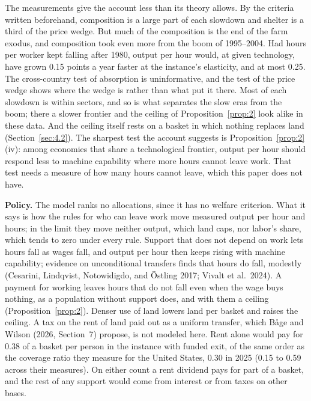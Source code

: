 \documentclass[12pt]{article}
\theoremstyle{plain}
\begin{document}
The measurements give the account less than its theory allows. By the criteria written beforehand, composition is a large part of each slowdown and shelter is a third of the price wedge. But much of the composition is the end of the farm exodus, and composition took even more from the boom of 1995--2004. Had hours per worker kept falling after 1980, output per hour would, at given technology, have grown 0.15 points a year faster at the instance's elasticity, and at most 0.25. The cross-country test of absorption is uninformative, and the test of the price wedge shows where the wedge is rather than what put it there. Most of each slowdown is within sectors, and so is what separates the slow eras from the boom; there a slower frontier and the ceiling of Proposition~\ref{prop:2} look alike in these data. And the ceiling itself rests on a basket in which nothing replaces land (Section~\ref{sec:4.2}). The sharpest test the account suggests is Proposition~\ref{prop:2}(iv): among economies that share a technological frontier, output per hour should respond less to machine capability where more hours cannot leave work. That test needs a measure of how many hours cannot leave, which this paper does not have.

\textbf{Policy.} The model ranks no allocations, since it has no welfare criterion. What it says is how the rules for who can leave work move measured output per hour and hours; in the limit they move neither output, which land caps, nor labor's share, which tends to zero under every rule. Support that does not depend on work lets hours fall as wages fall, and output per hour then keeps rising with machine capability; evidence on unconditional transfers finds that hours do fall, modestly (Cesarini, Lindqvist, Notowidigdo, and \"Ostling 2017; Vivalt et al.\ 2024). A payment for working leaves hours that do not fall even when the wage buys nothing, as a population without support does, and with them a ceiling (Proposition~\ref{prop:2}). Denser use of land lowers land per basket and raises the ceiling. A tax on the rent of land paid out as a uniform transfer, which B\r{a}ge and Wilson (2026, Section~7) propose, is not modeled here. Rent alone would pay for 0.38 of a basket per person in the instance with funded exit, of the same order as the coverage ratio they measure for the United States, 0.30 in 2025 (0.15 to 0.59 across their measures). On either count a rent dividend pays for part of a basket, and the rest of any support would come from interest or from taxes on other bases.
\end{document}
